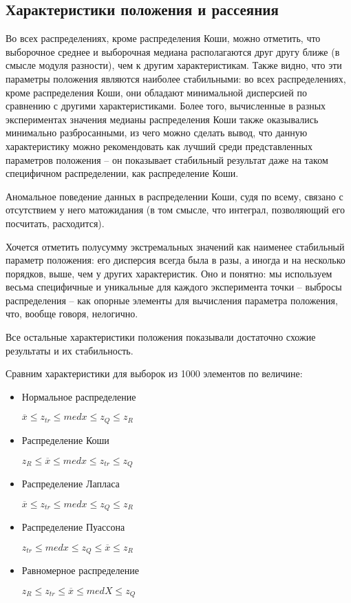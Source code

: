 \subsection{Характеристики положения и рассеяния}

Во всех распределениях, кроме распределения Коши, можно отметить, что выборочное среднее и выборочная медиана располагаются друг другу ближе (в смысле модуля разности), чем к другим характеристикам. Также видно, что эти параметры положения являются наиболее стабильными: во всех распределениях, кроме распределения Коши, они обладают минимальной дисперсией по сравнению с другими характеристиками. Более того, вычисленные в разных экспериментах значения медианы распределения Коши также оказывались минимально разбросанными, из чего можно сделать вывод, что данную характеристику можно рекомендовать как лучший среди представленных параметров положения -- он показывает стабильный результат даже на таком специфичном распределении, как распределение Коши.

Аномальное поведение данных в распределении Коши, судя по всему, связано с отсутствием у него матожидания (в том смысле, что интеграл, позволяющий его посчитать, расходится).

Хочется отметить полусумму экстремальных значений как наименее стабильный параметр положения: его дисперсия всегда была в разы, а иногда и на несколько порядков, выше, чем у других характеристик. Оно и понятно: мы используем весьма специфичные и уникальные для каждого эксперимента точки -- выбросы распределения -- как опорные элементы для вычисления параметра положения, что, вообще говоря, нелогично.

Все остальные характеристики положения показывали достаточно схожие результаты и их стабильность.

Сравним характеристики для выборок из 1000 элементов по величине:
\begin{itemize}
	\item Нормальное распределение
	
	$\overline{x} \leq z_{tr} \leq med{x} \leq z_Q \leq z_R $
	
	\item Распределение Коши
	
	$z_R \leq \overline{x} \leq med{x} \leq z_{tr} \leq z_Q $
	
	\item Распределение Лапласа
	
	$ \overline{x} \leq z_{tr} \leq med{x} \leq z_Q \leq z_R $
	
	\item Распределение Пуассона
	
	$ z_{tr} \leq med{x} \leq z_Q \leq \overline{x} \leq z_R $
	
	\item Равномерное распределение
	
	$ z_R \leq z_{tr} \leq \overline{x} \leq med{X} \leq z_Q $
	
\end{itemize}
